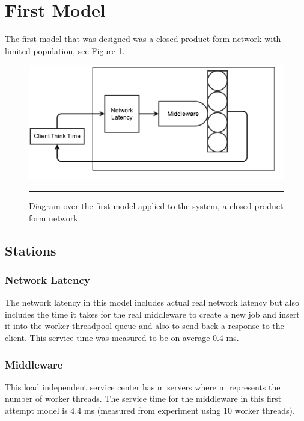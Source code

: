 \documentclass[a4paper, 11pt]{article}
\begin{document}
\section{First Model}\label{sec:first-model}
The first model that was designed was a closed product form network with limited population, see Figure \ref{fig:firstmodel}.

\begin{figure}[cht!]
	\centering
		\includegraphics[width=0.8\linewidth]{firstmodel}
		\rule{35em}{0.5pt}
	\caption{Diagram over the first model applied to the system, a closed product form network.}
	\label{fig:firstmodel}
\end{figure}

	\subsection{Stations}
		\subsubsection{Network Latency}
		The network latency in this model includes actual real network latency but also includes the time it takes for the real middleware to create a new job and insert it into the worker-threadpool queue and also to send back a response to the client. This service time was measured to be on average 0.4 ms.

		\subsubsection{Middleware}
		This load independent service center has m servers where m represents the number of worker threads. The service time for the middleware in this first attempt model is 4.4 ms (measured from experiment using 10 worker threads).
\end{document}
